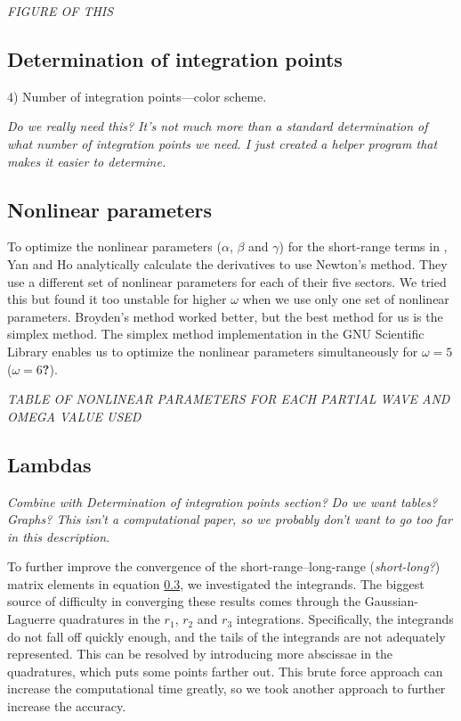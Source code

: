 \documentclass[preprint,showpacs,preprintnumbers,amsmath,amssymb]{revtex4}
\begin{document}
\emph{FIGURE OF THIS}




\subsection{Determination of integration points}
4) Number of integration points---color scheme.

\emph{Do we really need this? It's not much more than a standard determination of what number of integration points we need. I just created a helper program that makes it easier to determine.}

\subsection{Nonlinear parameters}
To optimize the nonlinear parameters ($\alpha$, $\beta$ and $\gamma$) for the short-range terms in \cite{YanHo1999}, Yan and Ho analytically calculate the derivatives to use Newton's method. They use a different set of nonlinear parameters for each of their five sectors. We tried this but found it too unstable for higher $\omega$ when we use only one set of nonlinear parameters. Broyden's method \cite{??} worked better, but the best method for us is the simplex method. The simplex method implementation in the GNU Scientific Library \cite{??} enables us to optimize the nonlinear parameters simultaneously for $\omega = 5$ (\textbf{$\omega = 6$?}).

\emph{TABLE OF NONLINEAR PARAMETERS FOR EACH PARTIAL WAVE AND OMEGA VALUE USED}


\subsection{Lambdas}
\emph{Combine with Determination of integration points section?}
\emph{Do we want tables? Graphs? This isn't a computational paper, so we probably don't want to go too far in this description.}

To further improve the convergence of the short-range--long-range (\emph{short-long?}) matrix elements in equation \ref{}, we investigated the integrands. The biggest source of difficulty in converging these results comes through the Gaussian-Laguerre quadratures in the $r_1$, $r_2$ and $r_3$ integrations. Specifically, the integrands do not fall off quickly enough, and the tails of the integrands are not adequately represented. This can be resolved by introducing more abscissae in the quadratures, which puts some points farther out. This brute force approach can increase the computational time greatly, so we took another approach to further increase the accuracy.
\end{document}
